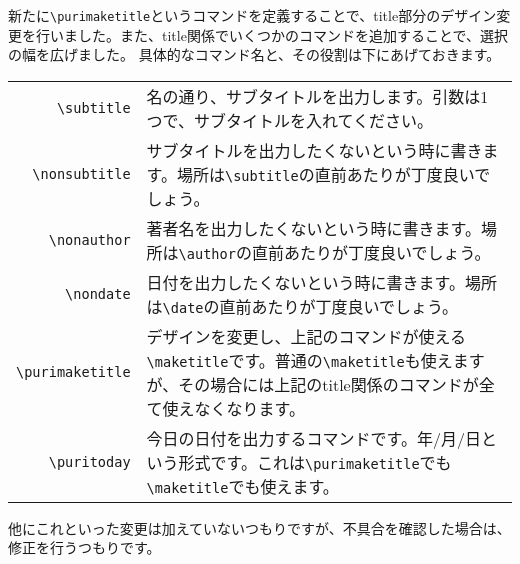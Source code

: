 \documentclass[lualatex,ja=standard,a4paper]{bxjsarticle}
\begin{document}
新たに\verb|\purimaketitle|というコマンドを定義することで、title部分のデザイン変更を行いました。また、title関係でいくつかのコマンドを追加することで、選択の幅を広げました。
具体的なコマンド名と、その役割は下にあげておきます。

\begin{longtable}{rp{30\purizw}}
\verb|\subtitle| & 名の通り、サブタイトルを出力します。引数は1つで、サブタイトルを入れてください。\\
\verb|\nonsubtitle| & サブタイトルを出力したくないという時に書きます。場所は\verb|\subtitle|の直前あたりが丁度良いでしょう。\\
\verb|\nonauthor| & 著者名を出力したくないという時に書きます。場所は\verb|\author|の直前あたりが丁度良いでしょう。\\
\verb|\nondate| & 日付を出力したくないという時に書きます。場所は\verb|\date|の直前あたりが丁度良いでしょう。\\
\verb|\purimaketitle| & デザインを変更し、上記のコマンドが使える\verb|\maketitle|です。普通の\verb|\maketitle|も使えますが、その場合には上記のtitle関係のコマンドが全て使えなくなります。\\
\verb|\puritoday| & 今日の日付を出力するコマンドです。年/月/日という形式です。これは\verb|\purimaketitle|でも\verb|\maketitle|でも使えます。
\end{longtable}

他にこれといった変更は加えていないつもりですが、不具合を確認した場合は、修正を行うつもりです。
\end{document}
